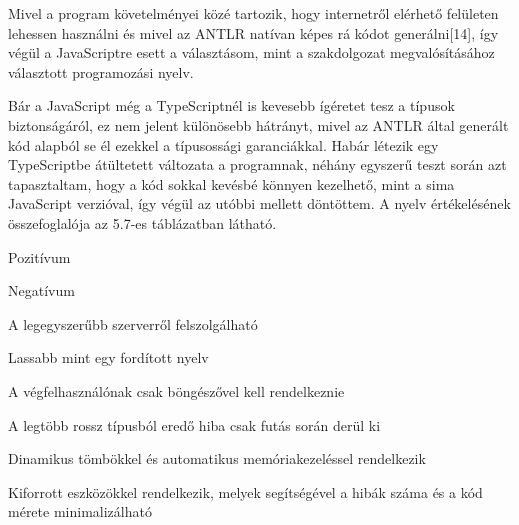 Mivel a program követelményei közé tartozik, hogy internetről elérhető felületen lehessen használni és mivel az ANTLR natívan képes rá kódot generálni[14], így végül a JavaScriptre esett a választásom, mint a szakdolgozat megvalósításához választott programozási nyelv.

Bár a JavaScript még a TypeScriptnél is kevesebb ígéretet tesz a típusok biztonságáról, ez nem jelent különösebb hátrányt, mivel az ANTLR által generált kód alapból se él ezekkel a típusossági garanciákkal. Habár létezik egy TypeScriptbe átültetett változata a programnak, néhány egyszerű teszt során azt tapasztaltam, hogy a kód sokkal kevésbé könnyen kezelhető, mint a sima JavaScript verzióval, így végül az utóbbi mellett döntöttem. A nyelv értékelésének összefoglalója az 5.7-es táblázatban látható.

Pozitívum

Negatívum

A legegyszerűbb szerverről felszolgálható

Lassabb mint egy fordított nyelv

A végfelhasználónak csak böngészővel kell rendelkeznie

A legtöbb rossz típusból eredő hiba csak futás során derül ki

Dinamikus tömbökkel és automatikus memóriakezeléssel rendelkezik

Kiforrott eszközökkel rendelkezik, melyek segítségével a hibák száma és a kód mérete minimalizálható

